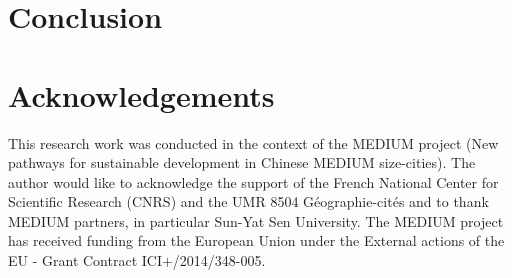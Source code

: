 \section*{Conclusion}





\section*{Acknowledgements}


This research work was conducted in the context of the MEDIUM project (New pathways for sustainable development in Chinese MEDIUM size-cities). The author would like to acknowledge the support of the French National Center for Scientific Research (CNRS) and the UMR 8504 G{\'e}ographie-cit{\'e}s and to thank MEDIUM partners, in particular Sun-Yat Sen University. The MEDIUM project has received funding from the European Union under the External actions of the EU - Grant Contract ICI+/2014/348-005.
















